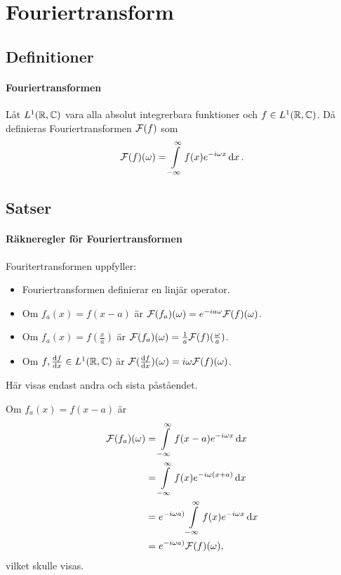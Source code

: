 \section{Fouriertransform}

\subsection{Definitioner}

\paragraph{Fouriertransformen}
Låt $L^{1}(\mathbb{R}, \mathbb{C})$ vara alla absolut integrerbara funktioner och $f\in L^{1}(\mathbb{R}, \mathbb{C})$. Då definieras Fouriertransformen $\mathcal{F}(f)$ som
\begin{align*}
	\mathcal{F}(f)(\omega) = \int\limits_{-\infty}^{\infty}f(x)e^{-i\omega x}\dd{x}.
\end{align*}

\subsection{Satser}

\paragraph{Räkneregler för Fouriertransformen}
Fouritertransformen uppfyller:
\begin{itemize}
	\item Fouriertransformen definierar en linjär operator.
	\item Om $f_{a}(x) = f(x - a)$ är $\mathcal{F}(f_{a})(\omega) = e^{-ia\omega}\mathcal{F}(f)(\omega)$.
	\item Om $f_{a}(x) = f(\frac{x}{a})$ är $\mathcal{F}(f_{a})(\omega) = \frac{1}{a}\mathcal{F}(f)(\frac{\omega}{a})$.
	\item Om $f,\dv{f}{x}\in L^{1}(\mathbb{R}, \mathbb{C})$ är $\mathcal{F}(\dv{f}{x})(\omega) = i\omega\mathcal{F}(f)(\omega)$.
\end{itemize}

\proof
Här visas endast andra och sista påståendet.

Om $f_{a}(x) = f(x - a)$ är 
\begin{align*}
	\mathcal{F}(f_{a})(\omega) &= \int\limits_{-\infty}^{\infty}f(x - a)e^{-i\omega x}\dd{x} \\
	                    &= \int\limits_{-\infty}^{\infty}f(x)e^{-i\omega(x + a)}\dd{x} \\
	                    &= e^{-i\omega a)}\int\limits_{-\infty}^{\infty}f(x)e^{-i\omega x}\dd{x} \\
	                    &= e^{-i\omega a)}\mathcal{F}(f)(\omega),
\end{align*}
vilket skulle visas.

